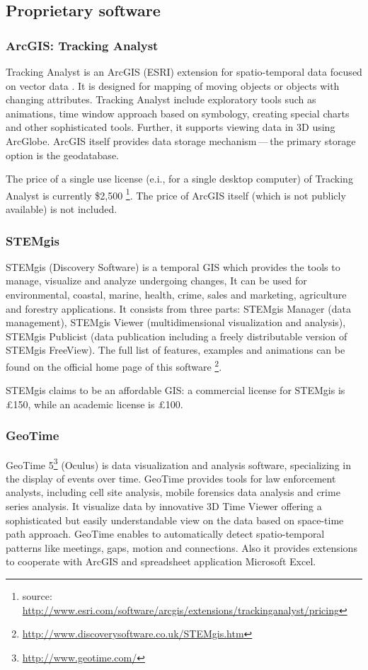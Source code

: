 \documentclass[a4paper,12pt,oneside]{book}
\newcommand{\dash}{\mbox{\,---\,}}
\begin{document}
\subsection{Proprietary software}
\subsubsection{ArcGIS: Tracking Analyst}
Tracking Analyst is an ArcGIS (ESRI) extension for spatio-temporal data focused on vector data \cite{arcgisHelp}.
It is designed for mapping of moving objects or objects with changing attributes.
Tracking Analyst include exploratory tools such as animations, time window approach based on symbology,
creating special charts and other sophisticated tools.
Further, it supports viewing data in 3D using ArcGlobe. 
ArcGIS itself provides data storage mechanism\dash the primary storage option is the geodatabase.

The price of a single use license (e.i., for a single desktop computer)
of Tracking Analyst is currently \$2,500%
\footnote{source: \url{http://www.esri.com/software/arcgis/extensions/trackinganalyst/pricing}}.
The price of ArcGIS itself (which is not publicly available) is not included.

\subsubsection{STEMgis}
STEMgis (Discovery Software) is a temporal GIS which provides the tools to manage, visualize
and analyze undergoing changes,
It can be used for environmental, coastal, marine, health, crime, sales and marketing,
agriculture and forestry applications.
It consists from three parts: STEMgis Manager (data management), 
STEMgis Viewer (multidimensional visualization and analysis),
STEMgis Publicist (data publication including a freely distributable version of STEMgis FreeView).
The full list of features, examples and animations can be found on the official home page of this software%
\footnote{\url{http://www.discoverysoftware.co.uk/STEMgis.htm}}.

STEMgis claims to be an affordable GIS: a commercial license for STEMgis is \pounds150,
while an academic license is \pounds100.

\subsubsection{GeoTime}
GeoTime 5\footnote{\url{http://www.geotime.com/}} (Oculus)
is data visualization and analysis software, specializing in
the display of events over time. GeoTime provides tools
for law enforcement analysts, including cell site analysis, mobile forensics data analysis
and crime series analysis. It visualize data by innovative 3D Time Viewer offering a sophisticated but 
easily understandable view on the data based on space-time path approach.
GeoTime enables to automatically detect spatio-temporal patterns like meetings, gaps, motion and connections.
Also it provides extensions to cooperate with ArcGIS and spreadsheet application Microsoft Excel.
\end{document}
